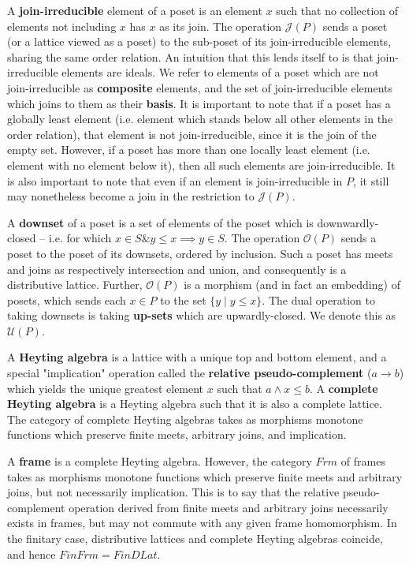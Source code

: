 \documentclass[hoptionsi,review,format=acmsmall]{acmart}
\theoremstyle{definition}
\newcommand{\Oc}{\mathcal{O}}
\newcommand{\Uc}{\mathcal{U}}
\newcommand{\Jc}{\mathcal{J}}
\newcommand{\band}{\mathbin{\&}}
\begin{document}
A \textbf{join-irreducible} element of a poset is an element \(x\) such that no collection of elements not including \(x\) has \(x\) as its join. The operation \(\Jc(P)\) sends a poset (or a lattice viewed as a poset) to the sub-poset of its join-irreducible elements, sharing the same order relation. An intuition that this lends itself to is that join-irreducible elements are ideals. We refer to elements of a poset which are not join-irreducible as \textbf{composite} elements, and the set of join-irreducible elements which joins to them as their \textbf{basis}. It is important to note that if a poset has a globally least element (i.e. element which stands below all other elements in the order relation), that element is not join-irreducible, since it is the join of the empty set. However, if a poset has more than one locally least element (i.e. element with no element below it), then all such elements are join-irreducible. It is also important to note that even if an element is join-irreducible in \(P\), it still may nonetheless become a join in the restriction to \(\Jc(P)\).

A \textbf{downset} of a poset is a set of elements of the poset which is downwardly-closed -- i.e. for which \(x \in S \band y \le x \implies y \in S\). The operation \(\Oc(P)\) sends a poset to the poset of its downsets, ordered by inclusion. Such a poset has meets and joins as respectively intersection and union, and consequently is a distributive lattice. Further, \(\Oc(P)\) is a morphism (and in fact an embedding) of posets, which sends each \(x \in P\) to the set \(\{y \mathbin{|} y \le x\}\). The dual operation to taking downsets is taking \textbf{up-sets}  which are upwardly-closed. We denote this as \(\Uc(P)\).

A \textbf{Heyting algebra} is a lattice with a unique top and bottom element, and a special "implication" operation called the \textbf{relative pseudo-complement} (\(a \rightarrow b\)) which yields the unique greatest element \(x\) such that \(a \wedge x \le b\). A \textbf{complete Heyting algebra} is a Heyting algebra such that it is also a complete lattice. The category of complete Heyting algebras takes as morphisms monotone functions which preserve finite meets, arbitrary joins, and implication.

A \textbf{frame} is a complete Heyting algebra. However, the category \(Frm\) of frames takes as morphisms monotone functions which preserve finite meets and arbitrary joins, but not necessarily implication. This is to say that the relative pseudo-complement operation derived from finite meets and arbitrary joins necessarily exists in frames, but may not commute with any given frame homomorphism. In the finitary case, distributive lattices and complete Heyting algebras coincide, and hence \(FinFrm = FinDLat\).
\end{document}
